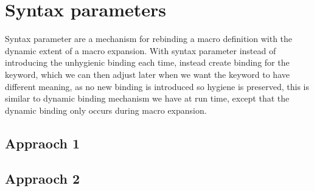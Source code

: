 \chapter{Syntax parameters}

Syntax parameter are a mechanism for rebinding a macro definition with the dynamic extent of a macro expansion. With syntax parameter instead of introducing the unhygienic binding each time, instead create binding for the keyword, which we can then adjust later when we want the keyword to have different meaning, as no new binding is introduced so hygiene is preserved, this is similar to dynamic binding mechanism we have at run time, except that the dynamic binding only occurs during macro expansion.

\section{Appraoch 1}

\section{Appraoch 2}